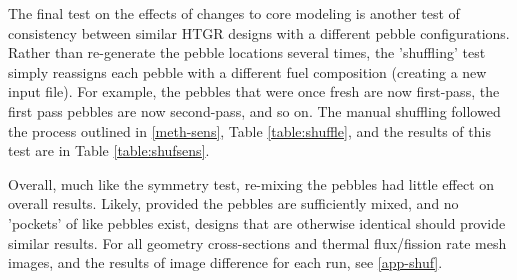 The final test on the effects of changes to core modeling is another test of consistency between similar HTGR designs with a different pebble configurations.  Rather than re-generate the pebble locations several times, the 'shuffling' test simply reassigns each pebble with a different fuel composition (creating a new input file).  For example, the pebbles that were once fresh are now first-pass, the first pass pebbles are now second-pass, and so on.  The manual shuffling followed the process outlined in \autoref{meth-sens}, Table \ref{table:shuffle}, and the results of this test are in Table \ref{table:shufsens}.



Overall, much like the symmetry test, re-mixing the pebbles had little effect on overall results.  Likely, provided the pebbles are sufficiently mixed, and no 'pockets' of like pebbles exist, designs that are otherwise identical should provide similar results.  For all geometry cross-sections and thermal flux/fission rate mesh images, and the results of image difference for each run, see \autoref{app-shuf}.